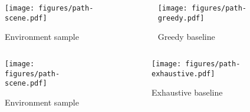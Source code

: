 \begin{frame}
    \begin{columns}
        \begin{column}{0.5\textwidth}
            \begin{figure}
                \centering
                \texttt{[image: figures/path-scene.pdf]}
                \par Environment sample
            \end{figure}
        \end{column}
        \begin{column}{0.5\textwidth}
            \begin{figure}
                \centering
                \texttt{[image: figures/path-greedy.pdf]}
                \par Greedy baseline
            \end{figure}
        \end{column}
    \end{columns}
\end{frame}

\begin{frame}
    \begin{columns}
        \begin{column}{0.5\textwidth}
            \begin{figure}
                \centering
                \texttt{[image: figures/path-scene.pdf]}
                \par Environment sample
            \end{figure}
        \end{column}
        \begin{column}{0.5\textwidth}
            \begin{figure}
                \centering
                \texttt{[image: figures/path-exhaustive.pdf]}
                \par Exhaustive baseline
            \end{figure}
        \end{column}
    \end{columns}
\end{frame}

